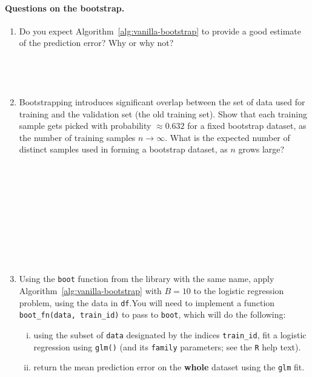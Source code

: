 \documentclass{article}
\begin{document}
\paragraph{Questions on the bootstrap.}
\begin{enumerate}
	\item Do you expect Algorithm~\ref{alg:vanilla-bootstrap} to provide a good
	estimate of the prediction error? Why or why not?

\begin{Verbatim}[frame=single]




\end{Verbatim}


	\item Bootstrapping introduces significant overlap
	between the set of data used for training and the validation set (the
	old training set). Show that each training sample gets picked with
	probability $\approx 0.632$ for a fixed bootstrap dataset, as the number
	of training samples $n \to \infty$. What is the expected number of distinct
	samples used in forming a bootstrap dataset, as $n$ grows large?
	\label{item:bootstrap-optional}
	\begin{Verbatim}[frame=single]











	\end{Verbatim}
	\item Using the \texttt{boot} function from the
	library with the same name,
	apply Algorithm~\ref{alg:vanilla-bootstrap} with $B = 10$ to the logistic
	regression problem, using the data in \texttt{df}.You will need to
	implement a function \texttt{boot\_fn(data, train\_id)} to pass to
	\texttt{boot}, which will do the following:
	\begin{enumerate}[(i)]
		\item using the subset of \texttt{data} designated by the indices
		\texttt{train\_id}, fit a logistic regression using \texttt{glm()}
		(and its \texttt{family} parameters; see the \texttt{R} help text).
		\item return the mean prediction error on the {\bf whole} dataset
		using the \texttt{glm} fit.
	\end{enumerate}

\begin{Verbatim}[frame=single]













\end{Verbatim}
\end{enumerate}
\end{document}
